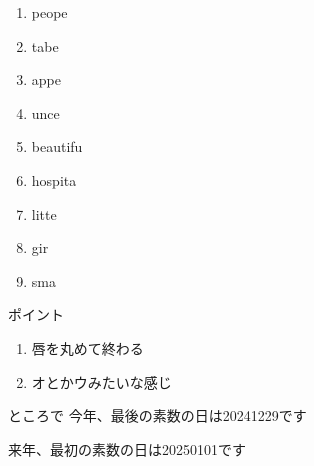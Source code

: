 \documentclass[aspectratio=169,xcolor={dvipsnames,table}]{beamer}
\begin{document}
\begin{frame}[plain]{\textipa{/\textltilde /}}

\large

\begin{enumerate}
 \item peope
 \item tabe
 \item appe
 \item unce
 \item beautifu
 \item hospita
 \item litte
 \item gir
 \item sma
\end{enumerate}

\vspace*{10pt}

\small
ポイント

\begin{enumerate}
 \item 唇を丸めて終わる
 \item オとかウみたいな感じ
\hfill{\scriptsize {}}

\end{enumerate}
\end{frame}
\begin{frame}[plain]{ところで}
 \Large
\centering
\pause
\vfill
今年、最後の素数の日は\pause{}20241229です\pause

来年、最初の素数の日は\pause{}20250101です\pause

\vfill


\raggedleft
\scsnowman[scale=5,hat=Maroon,snow,arms,buttons,note,muffler=NavyBlue]


\end{frame}
\end{document}
